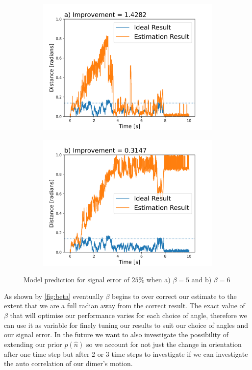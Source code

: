 \documentclass[final, 3p]{elsarticle}
\begin{document}
\begin{figure}
	\label{fig:beta}
	\centering
	\begin{subfigure}{0.49\textwidth}
		\includegraphics[width=\textwidth]{./Images/beta_5.png}
	\end{subfigure}
	\begin{subfigure}{0.49\textwidth}
		\includegraphics[width=\textwidth]{./Images/beta_6.png}
	\end{subfigure}
	\caption{Model prediction for signal error of $25\%$ when a) $\beta = 5$ and b) $\beta=6$}
\end{figure}

As shown by \ref{fig:beta} eventually $\beta$ begins to over correct our estimate to the extent that we are a full radian away from the correct result. The exact value of $\beta$ that will optimise our performance varies for each choice of angle, therefore we can use it as variable for finely tuning our results to suit our choice of angles and our signal error. In the future we want to also investigate the possibility of extending our prior $p(\hat{n})$ so we account for not just the change in orientation after one time step but after 2 or 3 time steps to investigate if we can investigate the auto correlation of our dimer's motion.
\end{document}
